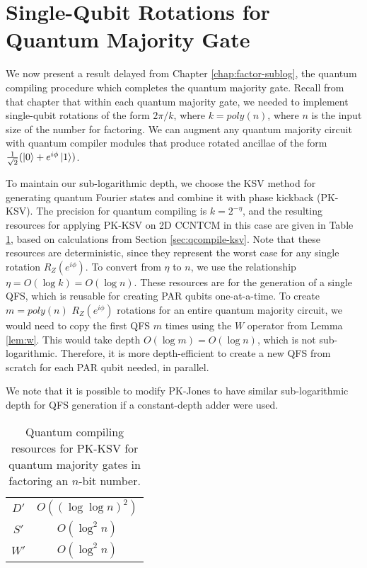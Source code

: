 \section{Single-Qubit Rotations for Quantum Majority Gate}
\label{sec:qcompile-maj}

We now present a result delayed from Chapter \ref{chap:factor-sublog},
the quantum compiling procedure which completes the quantum majority gate.
Recall from that chapter that within each quantum majority gate, we
needed to implement single-qubit rotations of the form
$2\pi / k$, where $k = poly(n)$, where $n$ is the input size of the
number for factoring. We can augment any quantum
majority circuit with quantum compiler modules that produce
rotated ancillae of the form $\frac{1}{\sqrt{2}}(\left\vert{0}\right\rangle + e^{i\phi}\left\vert{1}\right\rangle)$.

To maintain our sub-logarithmic depth, we choose the KSV method for
generating quantum Fourier states and combine it with phase kickback
(PK-KSV).
The precision for quantum compiling is $k = 2^{-\eta}$, and the
resulting resources for applying PK-KSV on \textsf{2D CCNTCM}
in this case are
given in Table \ref{tab:pk-ksv-resources}, based on calculations
from Section \ref{sec:qcompile-ksv}. Note that these resources
are deterministic, since they represent the worst case for any
single rotation $R_Z(e^{i\phi})$. To convert from $\eta$ to $n$,
we use the relationship $\eta = O(\log k) = O(\log n)$.
These resources are for the generation of a single QFS, which is
reusable for creating PAR qubits one-at-a-time. To create
$m = poly(n)$ $R_Z(e^{i\phi})$ rotations for an entire
quantum majority circuit, we would need to copy the first
QFS $m$ times using the $W$ operator from Lemma \ref{lem:w}.
This would take depth $O(\log m) = O(\log n)$,
which is not sub-logarithmic. Therefore, it is more
depth-efficient to create a new QFS from scratch for each
PAR qubit needed, in parallel.

We note that it is possible to modify PK-Jones to have
similar sub-logarithmic depth for QFS generation if a
constant-depth adder were used.

\begin{table}[hbt!]
\begin{center}
\begin{tabular}{|c|c|}
\hline
$D'$ & $O((\log \log n)^2)$ \\
$S'$ & $O(\log^2 n)$ \\
$W'$ & $O(\log^2 n)$ \\
\hline
\end{tabular}
\caption{Quantum compiling resources for PK-KSV for quantum majority gates
in factoring an $n$-bit number.}
\label{tab:pk-ksv-resources}
\end{center}
\end{table}

